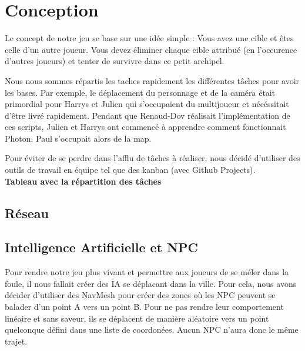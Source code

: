 \documentclass[french, 12pt]{article}
\begin{document}

\section{Conception}

    Le concept de notre jeu se base sur une idée simple : Vous avez une cible et êtes celle d'un autre joueur.
    Vous devez éliminer chaque cible attribué (en l'occurence d'autres joueurs) et tenter de survivre dans ce petit archipel.

    Nous nous sommes répartis les taches rapidement les différentes tâches pour avoir les bases.
    Par exemple, le déplacement du personnage et de la caméra était primordial pour Harrys et Julien qui s'occupaient du multijoueur et nécéssitait d'être livré rapidement.
    Pendant que Renaud-Dov réalisait l'implémentation de ces scripts, Julien et Harrys ont commencé à apprendre comment fonctionnait Photon. Paul s'occupait alors de la map.

    Pour éviter de se perdre dans l'afflu de tâches à réaliser, nous décidé d'utiliser des outils de travail en équipe tel que des kanban (avec Github Projects).\\
    


    \textbf{Tableau avec la répartition des tâches}

    
    \subsection{Réseau}


    \subsection{Intelligence Artificielle et NPC}

    Pour rendre notre jeu plus vivant et permettre aux joueurs de se méler dans la foule,
    il nous fallait créer des IA se déplacant dans la ville.
    Pour cela, nous avons décider d'utiliser des NavMesh pour créer des zones où les 
    NPC peuvent se balader d'un point A vers un point B.
    Pour ne pas rendre leur comportement linéaire et sans saveur,
    ils se déplacent de manière aléatoire  vers un point quelconque défini dans une liste de coordonées.
    Aucun NPC n'aura donc le même trajet.\\
\end{document}
